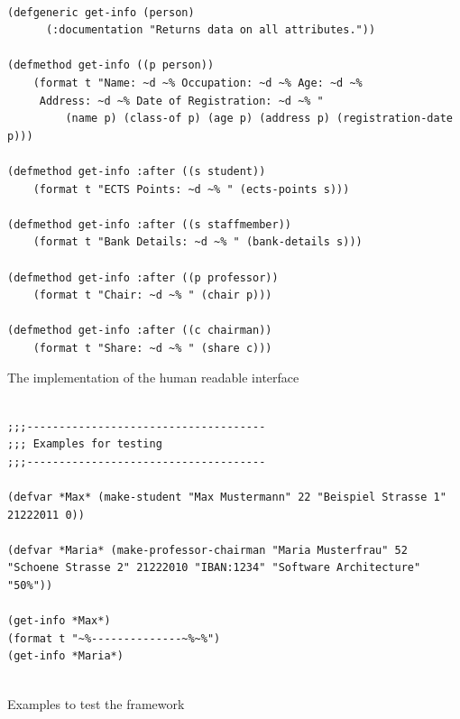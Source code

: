 \documentclass[oribibl]{llncs}
\begin{document}
\begin{listing}[]%
\begin{verbatim}

(defgeneric get-info (person)
      (:documentation "Returns data on all attributes."))

(defmethod get-info ((p person))
    (format t "Name: ~d ~% Occupation: ~d ~% Age: ~d ~% 
     Address: ~d ~% Date of Registration: ~d ~% "
         (name p) (class-of p) (age p) (address p) (registration-date p)))

(defmethod get-info :after ((s student))
    (format t "ECTS Points: ~d ~% " (ects-points s)))

(defmethod get-info :after ((s staffmember))
    (format t "Bank Details: ~d ~% " (bank-details s)))

(defmethod get-info :after ((p professor))
    (format t "Chair: ~d ~% " (chair p)))

(defmethod get-info :after ((c chairman))
    (format t "Share: ~d ~% " (share c)))

\end{verbatim}
\caption{The implementation of the human readable interface}
\label{lst:implementation}
\end{listing}


\begin{listing}[]%
\begin{verbatim}

;;;-------------------------------------
;;; Examples for testing
;;;-------------------------------------

(defvar *Max* (make-student "Max Mustermann" 22 "Beispiel Strasse 1" 21222011 0))

(defvar *Maria* (make-professor-chairman "Maria Musterfrau" 52 "Schoene Strasse 2" 21222010 "IBAN:1234" "Software Architecture" "50%"))

(get-info *Max*)
(format t "~%--------------~%~%")
(get-info *Maria*)


\end{verbatim}
\caption{Examples to test the framework}
\label{lst:examples}
\end{listing}
\end{document}
